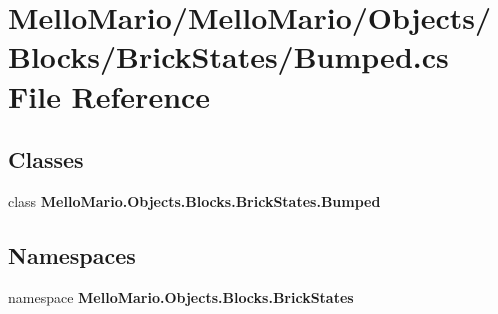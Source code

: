 \section{Mello\+Mario/\+Mello\+Mario/\+Objects/\+Blocks/\+Brick\+States/\+Bumped.cs File Reference}
\label{BrickStates_2Bumped_8cs}
\subsection*{Classes}
\begin{DoxyCompactItemize}
\item 
class \textbf{ Mello\+Mario.\+Objects.\+Blocks.\+Brick\+States.\+Bumped}
\end{DoxyCompactItemize}
\subsection*{Namespaces}
\begin{DoxyCompactItemize}
\item 
namespace \textbf{ Mello\+Mario.\+Objects.\+Blocks.\+Brick\+States}
\end{DoxyCompactItemize}
